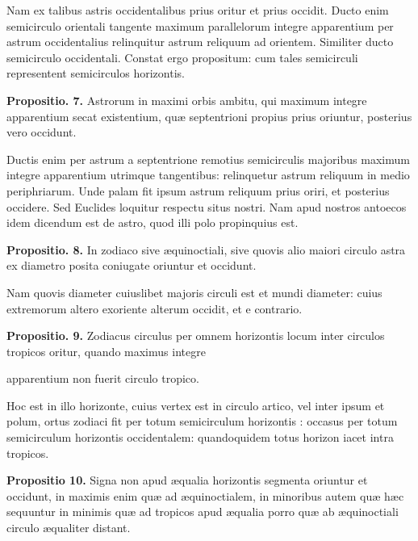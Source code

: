 \documentclass[11pt,a4paper]{article}
\begin{document}
Nam ex talibus astris occidentalibus prius oritur et prius occidit. Ducto enim semicirculo orientali tangente maximum parallelorum integre apparentium per astrum occidentalius relinquitur astrum reliquum ad orientem. Similiter ducto semicirculo occidentali. Constat ergo propositum: cum tales semicirculi representent semicirculos horizontis.

\textbf{Propositio. 7.} Astrorum in maximi orbis ambitu, qui maximum integre apparentium secat existentium, quæ septentrioni propius prius oriuntur, posterius vero occidunt.

Ductis enim per astrum a septentrione remotius semicirculis majoribus maximum integre apparentium utrimque tangentibus: relinquetur astrum reliquum in medio periphriarum. Unde palam fit ipsum astrum reliquum prius oriri, et posterius occidere. Sed Euclides loquitur respectu situs nostri. Nam apud nostros antoecos idem dicendum est de astro, quod illi polo propinquius est.

\textbf{Propositio. 8.} In zodiaco sive æquinoctiali, sive quovis alio maiori circulo astra ex diametro posita coniugate oriuntur et occidunt.

Nam quovis diameter cuiuslibet majoris circuli est et mundi diameter: cuius extremorum altero exoriente alterum occidit, et e contrario.

\textbf{Propositio. 9.} Zodiacus circulus per omnem horizontis locum inter circulos tropicos oritur, quando maximus integre

apparentium non  fuerit circulo tropico.

Hoc est in illo horizonte, cuius vertex est in circulo artico, vel inter ipsum et polum, ortus zodiaci fit per totum semicirculum horizontis : occasus per totum semicirculum horizontis occidentalem: quandoquidem totus horizon iacet intra tropicos.

\textbf{Propositio 10.} Signa non apud æqualia horizontis segmenta oriuntur et occidunt, in maximis enim quæ ad æquinoctialem, in minoribus autem quæ hæc sequuntur in minimis quæ ad tropicos apud æqualia porro quæ ab æquinoctiali circulo æqualiter distant.
\end{document}
